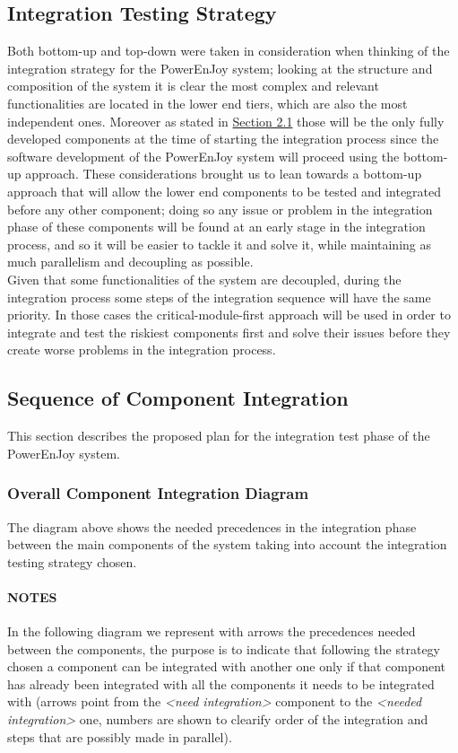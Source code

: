 \subsection{Integration Testing Strategy} \label{sec:intStrategy}
Both bottom-up and top-down were taken in consideration when thinking of the integration strategy for the PowerEnJoy system; looking at the structure and composition of the system it is clear the most complex and relevant functionalities are located in the lower end tiers, which are also the most independent ones. Moreover as stated in \hyperref[sec:entryCriteria]{Section 2.1} those will be the only fully developed components at the time of starting the integration process since the software development of the PowerEnJoy system will proceed using the bottom-up approach. These considerations brought us to lean towards a bottom-up approach that will allow the lower end components to be tested and integrated before any other component; doing so any issue or problem in the integration phase of these components will be found at an early stage in the integration process, and so it will be easier to tackle it and solve it, while maintaining as much parallelism and decoupling as possible.\\
Given that some functionalities of the system are decoupled, during the integration process some steps of the integration sequence will have the same priority. In those cases the critical-module-first approach will be used in order to integrate and test the riskiest  components first and solve their issues before they create worse problems in the integration process.

\subsection{Sequence of Component Integration}
This section describes the proposed plan for the integration test phase of the PowerEnJoy system.

\subsubsection{Overall Component Integration Diagram}  \label{sec:overallPrecedences}
The diagram above shows the needed precedences in the integration phase between the main components of the system taking into account the integration testing strategy chosen.

\paragraph{NOTES} In the following diagram we represent with arrows the precedences needed between the components, the purpose is to indicate that following the strategy chosen a component can be integrated with another one only if that component has already been integrated with all the components it needs to be integrated with (arrows point from the \emph{<need integration>} component to the \emph{<needed integration>} one, numbers are shown to clearify order of the integration and steps that are possibly made in parallel).\\


